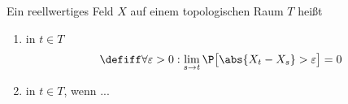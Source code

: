 \begin{definition}\label{def2.2.2}
	Ein reellwertiges Feld $X$ auf einem topologischen Raum $T$ heißt
	\begin{enumerate}%
		\item {} in $t\in T$
		\begin{align*}
			\defiff\forall\varepsilon>0:\lim\limits_{s\to t}\P\big[\abs{X_t-X_s}>\varepsilon\big]=0
		\end{align*}
		\item {} in $t\in T$, wenn ...
	\end{enumerate}
\end{definition}


